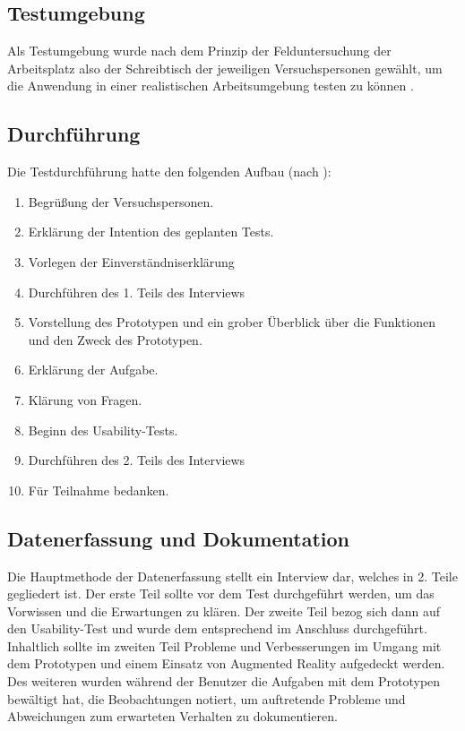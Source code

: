 \subsection{Testumgebung}
Als Testumgebung wurde nach dem Prinzip der Felduntersuchung der Arbeitsplatz also der Schreibtisch der jeweiligen Versuchspersonen gewählt, um die Anwendung in einer realistischen Arbeitsumgebung testen zu können \citep[S. 44]{hegner:evaluation}.

\subsection{Durchführung}
Die Testdurchführung hatte den folgenden Aufbau (nach \cite[S. 46]{hegner:evaluation}):
\begin{enumerate}
\item Begrüßung der Versuchspersonen.
\item Erklärung der Intention des geplanten Tests.
\item Vorlegen der Einverständniserklärung
\item Durchführen des 1. Teils des Interviews
\item Vorstellung des Prototypen und ein grober Überblick über die Funktionen und den Zweck des Prototypen.
\item Erklärung der Aufgabe.
\item Klärung von Fragen.
\item Beginn des Usability-Tests.
\item Durchführen des 2. Teils des Interviews
\item Für Teilnahme bedanken.
\end{enumerate} 

\subsection{Datenerfassung und Dokumentation}
Die Hauptmethode der Datenerfassung stellt ein Interview dar, welches in 2. Teile gegliedert ist. Der erste Teil sollte vor dem Test durchgeführt werden, um das Vorwissen und die Erwartungen zu klären. Der zweite Teil bezog sich dann auf den Usability-Test und wurde dem entsprechend im Anschluss durchgeführt. Inhaltlich sollte im zweiten Teil Probleme und Verbesserungen im Umgang mit dem Prototypen und einem Einsatz von Augmented Reality aufgedeckt werden.\\
Des weiteren wurden während der Benutzer die Aufgaben mit dem Prototypen bewältigt hat, die Beobachtungen notiert, um auftretende Probleme und Abweichungen zum erwarteten Verhalten zu dokumentieren.

